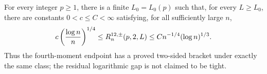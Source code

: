 For every integer \(p\geq1\), there is a finite \(L_0=L_0(p)\) such that, for every \(L\geq L_0\), there are constants \(0<c\leq C<\infty\) satisfying, for all sufficiently large \(n\),
\[
 c\left({\log n\over n}\right)^{1/4}
 \leq R^{12,\pm}_n(p,2,L)
 \leq Cn^{-1/4}(\log n)^{1/3}.
\]
Thus the fourth-moment endpoint has a proved two-sided bracket under exactly the same class; the residual logarithmic gap is not claimed to be tight.